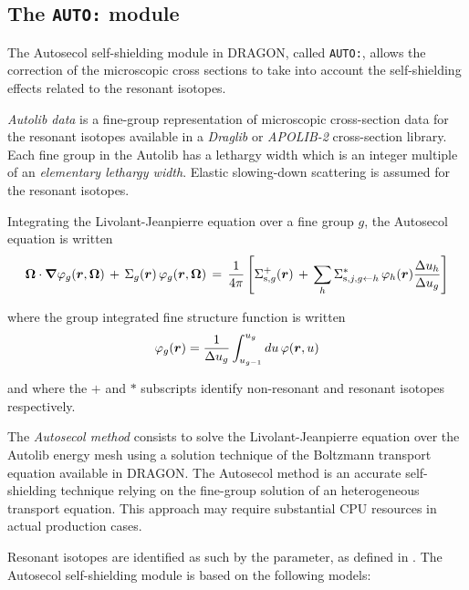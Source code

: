 \subsection{The {\tt AUTO:} module}\label{sect:AUTOData}

The Autosecol self-shielding module in DRAGON, called {\tt AUTO:}, allows the
correction of the microscopic cross sections to take into account the
self-shielding effects related to the resonant isotopes.\cite{autosecol}

\vskip 0.08cm

{\sl Autolib data} is a fine-group representation of microscopic cross-section data for the resonant isotopes available in a
{\sl Draglib} or {\sl APOLIB-2} cross-section library. Each fine group in the Autolib has a lethargy width which is an integer multiple of an
{\sl elementary lethargy width}. Elastic slowing-down scattering is assumed for the resonant isotopes.

Integrating the Livolant-Jeanpierre equation over a fine group $g$, the Autosecol equation is written
\begin{equation}
\bff(\Omega)\cdot\bff(\nabla)\varphi_g(\bff(r),\bff(\Omega))\,+\,\Sigma_g(\bff(r))\,\varphi_g(\bff(r),\bff(\Omega))\,=\,{1\over 4\pi} \left[ \Sigma_{{\rm s},g}^+(\bff(r)) \, + \,\sum_h \Sigma_{{\rm s},j,g \leftarrow h}^{*} \, \varphi_h(\bff(r)) {\Delta u_h\over \Delta u_g} \right]
\label{eq:auto1}
\end{equation}

\noindent where the group integrated fine structure function is written
\begin{equation}
\varphi_g(\bff(r))={1\over \Delta u_g}\int_{u_{g-1}}^{u_g} du\, \varphi(\bff(r),u)
\label{eq:auto2}
\end{equation}

\noindent and where the $+$ and $*$ subscripts identify non-resonant and resonant isotopes respectively.

\vskip 0.08cm

The {\sl Autosecol method} consists to solve the Livolant-Jeanpierre equation over the Autolib energy mesh using a solution
technique of the Boltzmann transport equation available in DRAGON.\cite{PIP2009} The Autosecol method
is an accurate self-shielding technique relying on the fine-group solution of an heterogeneous transport equation. This approach may require
substantial CPU resources in actual production cases.

\vskip 0.08cm

Resonant isotopes are identified as such by the  parameter, as defined in
. The Autosecol self-shielding module is based on the following models:

